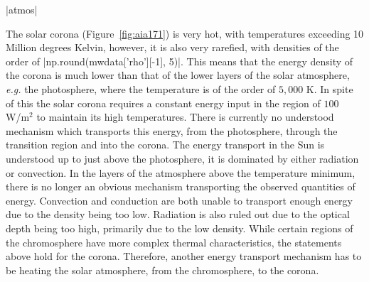 \py[chapter1]|atmos|


The solar corona (Figure~\ref{fig:aia171}) is very hot, with temperatures exceeding 10 Million degrees Kelvin, however, it is also very rarefied, with densities of the order of \py[chapter1]|np.round(mwdata['rho'][-1], 5)|.
This means that the energy density of the corona is much lower than that of the lower layers of the solar atmosphere, \textit{e.g.} the photosphere, where the temperature is of the order of $5,000$ K.
In spite of this the solar corona requires a constant energy input in the region of $100$ W/m$^2$ to maintain its high temperatures.
There is currently no understood mechanism which transports this energy, from the photosphere, through the transition region and into the corona. %
The energy transport in the Sun is understood up to just above the photosphere, it is dominated by either radiation or convection.
In the layers of the atmosphere above the temperature minimum, there is no longer an obvious mechanism transporting the observed quantities of energy.
Convection and conduction are both unable to transport enough energy due to the density being too low.
Radiation is also ruled out due to the optical depth being too high, primarily due to the low density.
While certain regions of the chromosphere have more complex thermal characteristics, the statements above hold for the corona.
Therefore, another energy transport mechanism has to be heating the solar atmosphere, from the chromosphere, to the corona.



